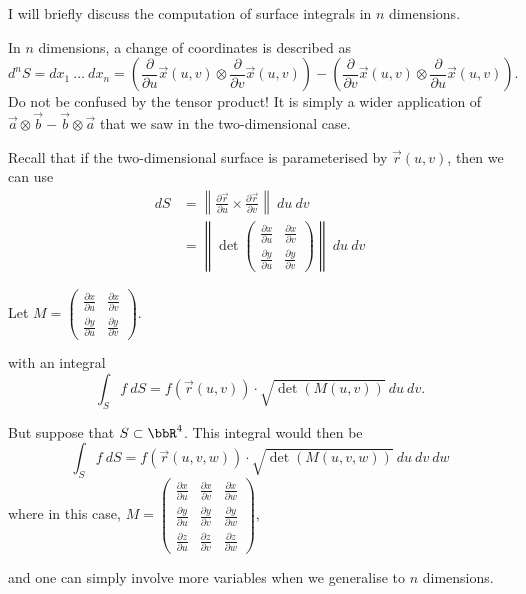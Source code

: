 \documentclass[a4paper, 12pt,oneside,openany]{book}
\begin{document}
I will briefly discuss the computation of surface integrals in $n$ dimensions.

In $n$ dimensions, a change of coordinates is described as $$d^nS = dx_1\ \dots\ dx_n = \left(\frac{\partial}{\partial u} \vec{x}(u, v) \otimes \frac{\partial}{\partial v} \vec{x}(u, v)\right)-\left(\frac{\partial}{\partial v} \vec{x}(u, v) \otimes \frac{\partial}{\partial u} \vec{x}(u, v)\right).$$ Do not be confused by the tensor product! It is simply a wider application of $\vec{a}\otimes \vec{b}-\vec{b}\otimes\vec{a}$ that we saw in the two-dimensional case.

Recall that if the two-dimensional surface is parameterised by $\vec{r}(u, v)$, then we can use \begin{align*} dS &= \left\| \frac{\partial \vec{r}}{\partial u} \times \frac{\partial \vec{r}}{\partial v} \right\| \ du\ dv  \\ &= \left\| \det \begin{pmatrix} \frac{\partial x}{\partial u} & \frac{\partial x}{\partial v} \\ \frac{\partial y}{\partial u} & \frac{\partial y}{\partial v} \end{pmatrix}\right\| \ du\ dv\end{align*}

Let $M = \begin{pmatrix} \frac{\partial x}{\partial u} & \frac{\partial x}{\partial v} \\ \frac{\partial y}{\partial u} & \frac{\partial y}{\partial v} \end{pmatrix}$.

with an integral $$\int_S f\ dS = f(\vec{r}(u, v))\cdot \sqrt{\det(M(u, v))}\ du\ dv.$$

But suppose that $S \subset \bbR^4$. This integral would then be $$\int_S f\ dS = f(\vec{r}(u, v, w))\cdot \sqrt{\det(M(u, v, w))}\ du\ dv\ dw$$ where in this case, $M = \begin{pmatrix} \frac{\partial x}{\partial u} & \frac{\partial x}{\partial v} & \frac{\partial x}{\partial w} \\ \frac{\partial y}{\partial u} & \frac{\partial y}{\partial v} & \frac{\partial y}{\partial w} \\ \frac{\partial z}{\partial u} & \frac{\partial z}{\partial v} & \frac{\partial z}{\partial w} \end{pmatrix}$,

and one can simply involve more variables when we generalise to $n$ dimensions.
\end{document}
